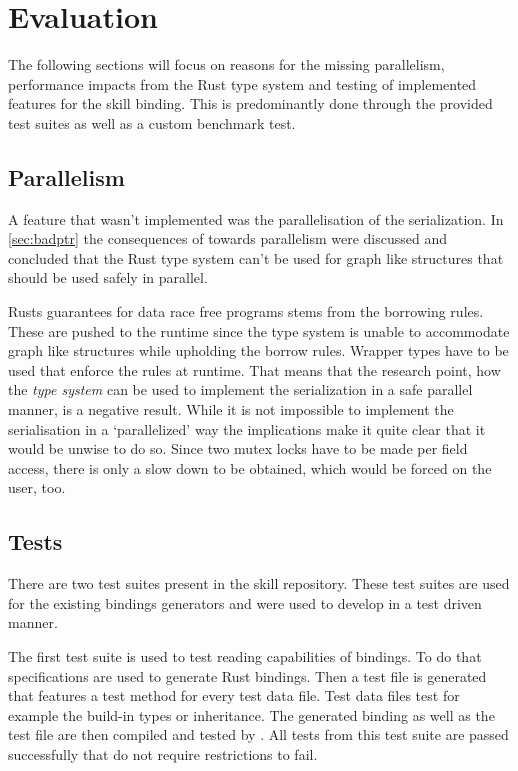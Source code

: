\documentclass[thesis]{subfiles}
\begin{document}
\chapter{Evaluation}\label{chap:eval}
The following sections will focus on reasons for the missing parallelism, performance impacts from the Rust type system and testing of implemented features for the \gls{skill} binding.
This is predominantly done through the provided test suites as well as a custom benchmark test.

\section{Parallelism}
  A feature that wasn't implemented was the parallelisation of the serialization.
  In \autoref{sec:badptr} the consequences of \PtrT towards parallelism were discussed and concluded that the Rust type system can't be used for graph like structures that should be used safely in parallel.

  Rusts guarantees for data race free programs stems from the borrowing rules.
  These are pushed to the runtime since the type system is unable to accommodate graph like structures while upholding the borrow rules.
  Wrapper types have to be used that enforce the rules at runtime.
  That means that the research point, how the \emph{type system} can be used to implement the serialization in a safe parallel manner, is a negative result.
  While it is not impossible to implement the serialisation in a `parallelized' way the implications make it quite clear that it would be unwise to do so.
  Since two mutex locks have to be made per field access, there is only a slow down to be obtained, which would be forced on the user, too.

\section{Tests}
  There are two test suites present in the \gls{skill} repository\autocite{skill-repo}.
  These test suites are used for the existing bindings generators and were used to develop in a test driven manner.

  The first test suite is used to test reading capabilities of bindings.
  To do that specifications are used to generate Rust bindings.
  Then a test file is generated that features a test method for every test data file.
  Test data files test for example the build-in types or inheritance.
  The generated binding as well as the test file are then compiled and tested by .
  All tests from this test suite are passed successfully that do not require restrictions to fail.%
\end{document}
